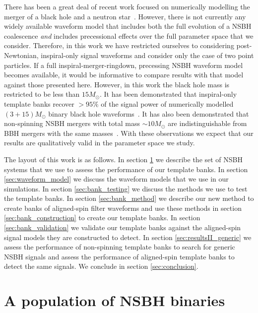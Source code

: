 There has been a great deal of recent work focused on numerically 
modelling the merger of a black hole and a neutron 
star~\cite{Duez:2009yz,Shibata:2011jka,Pannarale:2012ux,Lackey:2013axa,
Foucart:2013psa}. However, there is not currently any widely available waveform 
model 
that includes both the full evolution of a \ac{NSBH} coalescence \emph{and} 
includes precessional effects over the full parameter space that we consider.
Therefore, in this work we have restricted ourselves to considering 
post-Newtonian, inspiral-only signal waveforms and consider only the case of two 
point particles. If a full 
inspiral-merger-ringdown, precessing \ac{NSBH} waveform model 
becomes available, it would be informative to compare results with that model 
against those presented here. However, in this work the black hole mass is 
restricted to be less than $15M_{\odot}$. It has been demonstrated that 
inspiral-only template banks recover $> 95\%$ of the signal power of 
numerically modelled $(3+15)M_{\odot}$ binary black hole 
waveforms~\cite{Brown:2012nn,Smith:2013mfa}. It has also been demonstrated that 
non-spinning \ac{NSBH} mergers with total mass $\sim 10M_{\odot}$ are 
indistinguishable from \ac{BBH} mergers with the same 
masses~\cite{Foucart:2013psa}. With these observations we expect that 
our results are qualitatively valid in the parameter space we study.

The layout of this work is as follows. In section \ref{sec:nsbhpop} we describe
the set of \ac{NSBH} systems that we use to assess
the performance of our template banks. In section \ref{sec:waveform_model} we
discuss the waveform models that we use in our simulations. In section
\ref{sec:bank_testing} we discuss the methods we use to test the template
banks. In section \ref{sec:bank_method} we describe our new method to
create banks of aligned-spin filter waveforms and use these methods in section
\ref{sec:bank_construction} to create our template banks. In section
\ref{sec:bank_validation} we validate our template banks against the
aligned-spin signal models they are constructed to detect. In section
\ref{sec:resultsII_generic} we assess the performance of non-spinning template 
banks to search for generic \ac{NSBH} signals and assess the performance of 
aligned-spin template banks to detect the same signals. We conclude in section 
\ref{sec:conclusion}.

\section{A population of NSBH binaries}
\label{sec:nsbhpop}

